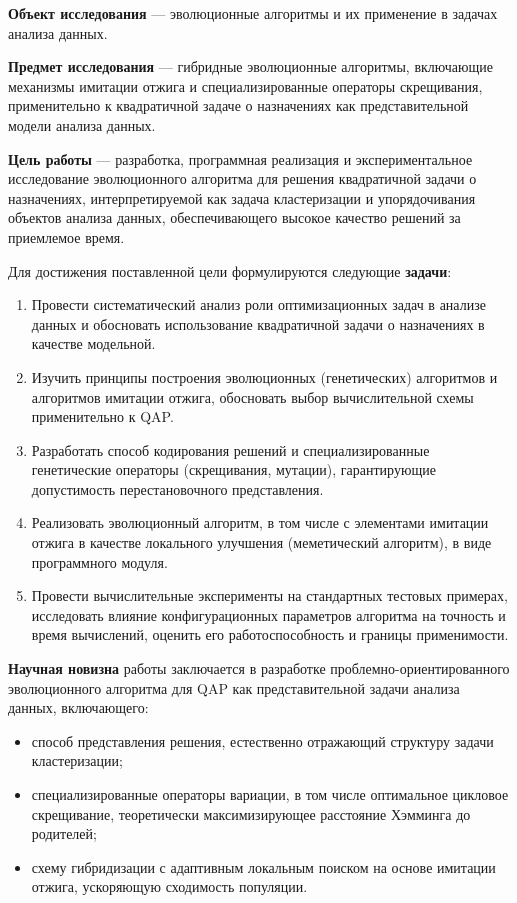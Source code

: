 \documentclass[732]{studrep}
\theoremstyle{nonumberplain}
\begin{document}
\textbf{Объект исследования} — эволюционные алгоритмы и их применение в задачах анализа данных.

\textbf{Предмет исследования} — гибридные эволюционные алгоритмы, включающие механизмы имитации отжига и специализированные операторы скрещивания, применительно к квадратичной задаче о назначениях как представительной модели анализа данных.

\textbf{Цель работы} — разработка, программная реализация и экспериментальное исследование эволюционного алгоритма для решения квадратичной задачи о назначениях, интерпретируемой как задача кластеризации и упорядочивания объектов анализа данных, обеспечивающего высокое качество решений за приемлемое время.

Для достижения поставленной цели формулируются следующие \textbf{задачи}:
\begin{enumerate}
\item Провести систематический анализ роли оптимизационных задач в анализе данных и обосновать использование квадратичной задачи о назначениях в качестве модельной.
\item Изучить принципы построения эволюционных (генетических) алгоритмов и алгоритмов имитации отжига, обосновать выбор вычислительной схемы применительно к QAP.
\item Разработать способ кодирования решений и специализированные генетические операторы (скрещивания, мутации), гарантирующие допустимость перестановочного представления.
\item Реализовать эволюционный алгоритм, в том числе с элементами имитации отжига в качестве локального улучшения (меметический алгоритм), в виде программного модуля.
\item Провести вычислительные эксперименты на стандартных тестовых примерах, исследовать влияние конфигурационных параметров алгоритма на точность и время вычислений, оценить его работоспособность и границы применимости.
\end{enumerate}

\textbf{Научная новизна} работы заключается в разработке проблемно-ориентированного эволюционного алгоритма для QAP как представительной задачи анализа данных, включающего:
\begin{itemize}
\item способ представления решения, естественно отражающий структуру задачи кластеризации;
\item специализированные операторы вариации, в том числе оптимальное цикловое скрещивание, теоретически максимизирующее расстояние Хэмминга до родителей;
\item схему гибридизации с адаптивным локальным поиском на основе имитации отжига, ускоряющую сходимость популяции.
\end{itemize}
\end{document}
